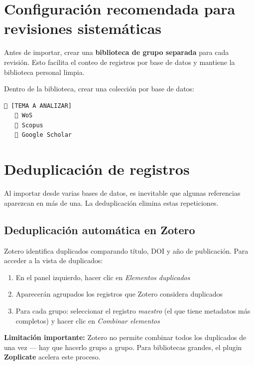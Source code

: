 \documentclass[
]{book}
\providecommand{\tightlist}{%
  \setlength{\itemsep}{0pt}\setlength{\parskip}{0pt}}
\begin{document}
\section{Configuración recomendada para revisiones sistemáticas}\label{configuraciuxf3n-recomendada-para-revisiones-sistemuxe1ticas}

Antes de importar, crear una \textbf{biblioteca de grupo separada} para cada revisión. Esto facilita el conteo de registros por base de datos y mantiene la biblioteca personal limpia.

Dentro de la biblioteca, crear una colección por base de datos:

\begin{verbatim}
📁 [TEMA A ANALIZAR]
   📂 WoS
   📂 Scopus
   📂 Google Scholar
\end{verbatim}

\section{Deduplicación de registros}\label{deduplicaciuxf3n-de-registros}

Al importar desde varias bases de datos, es inevitable que algunas referencias aparezcan en más de una. La deduplicación elimina estas repeticiones.

\subsection{Deduplicación automática en Zotero}\label{deduplicaciuxf3n-automuxe1tica-en-zotero}

Zotero identifica duplicados comparando título, DOI y año de publicación. Para acceder a la vista de duplicados:

\begin{enumerate}
\def\labelenumi{\arabic{enumi}.}
\tightlist
\item
  En el panel izquierdo, hacer clic en \emph{Elementos duplicados}
\item
  Aparecerán agrupados los registros que Zotero considera duplicados
\item
  Para cada grupo: seleccionar el registro \emph{maestro} (el que tiene metadatos más completos) y hacer clic en \emph{Combinar elementos}
\end{enumerate}

\textbf{Limitación importante:} Zotero no permite combinar todos los duplicados de una vez --- hay que hacerlo grupo a grupo. Para bibliotecas grandes, el plugin \textbf{Zoplicate} acelera este proceso.
\end{document}
